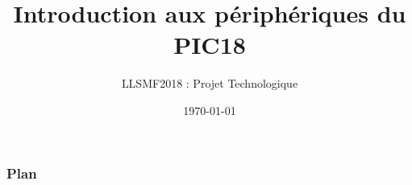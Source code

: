 \documentclass{beamer}
\title{Introduction aux périphériques du PIC18}
\subtitle{LLSMF2018 : Projet Technologique}
\author{}
\institute{UCL}
\date{\today}
\begin{document}

\begin{frame}
\titlepage
\end{frame}

\begin{frame}
\frametitle{Plan}
\tableofcontents
\end{frame}





\end{document}
